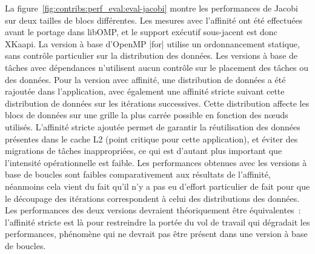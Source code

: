 La figure~\ref{fig:contribs:perf_eval:eval-jacobi} montre les performances de Jacobi sur deux tailles de blocs différentes.
Les mesures avec l'affinité ont été effectuées avant le portage dans libOMP, et le support exécutif sous-jacent est donc XKaapi.
La version à base d'OpenMP |for| utilise un ordonnancement statique, sans contrôle particulier sur la distribution des données.
Les versions à base de tâches avec dépendances n'utilisent aucun contrôle sur le placement des tâches ou des données.
Pour la version avec affinité, une distribution de données a été rajoutée dans l'application, avec également une affinité stricte suivant cette distribution de données sur les itérations successives.
Cette distribution affecte les blocs de données sur une grille la plus carrée possible en fonction des nœuds utilisés.
L'affinité stricte ajoutée permet de garantir la réutilisation des données présentes dans le cache L2 (point critique pour cette application), et éviter des migrations de tâches inappropriées, ce qui est d'autant plus important que l'intensité opérationnelle est faible.
Les performances obtenues avec les versions à base de boucles sont faibles comparativement aux résultats de l'affinité, néanmoins cela vient du fait qu'il n'y a pas eu d'effort particulier de fait pour que le découpage des itérations correspondent à celui des distributions des données.
Les performances des deux versions devraient théoriquement être équivalentes~: l'affinité stricte est là pour restreindre la portée du vol de travail qui dégradait les performances, phénomène qui ne devrait pas être présent dans une version à base de boucles.
